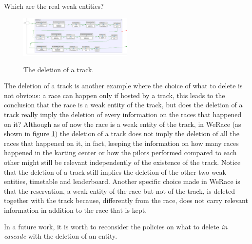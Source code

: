 \documentclass{beamer}
\newcommand{\kc}{WeRace}
\begin{document}
\begin{frame}{Which are the real weak entities?}
    \scriptsize
    \begin{figure}
        \centering
        \includegraphics[width=0.5\textwidth]{drawio/del-track.png}
        \label{fig:delete-track}
        \caption{The deletion of a track.}
    \end{figure}
    The deletion of a track is another example where the choice of what to delete is not obvious:
    a race can happen only if hosted by a track, this leads to the conclusion that the race is a weak entity 
    of the track, but does the deletion of a track really imply the deletion of every information on the races 
    that happened on it? Although as of now the race is a weak entity of the track, in \kc{} (as shown
    in figure \ref{fig:delete-track}) the deletion of a track does 
    not imply the deletion of all the races that happened on it, in fact, 
    keeping the information on how many races happened 
    in the karting center or how the pilots performed compared to each other
    might still be relevant independently of the existence of the track.
    Notice that the deletion of a track still implies the deletion of the other two weak entities, timetable and leaderboard.
    Another specific choice made in \kc{} is that the reservation, a weak entity of the race but not of the track, is deleted together 
    with the track because, differently from the race, does not carry relevant information in addition to the race that is kept.
    
    In a future work, it is worth to reconsider the policies on what to delete \textit{in cascade} with the deletion of an entity.
\end{frame}
\end{document}
